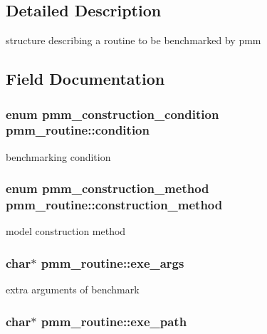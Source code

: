\subsection{Detailed Description}
structure describing a routine to be benchmarked by pmm 

\subsection{Field Documentation}
\hypertarget{structpmm__routine_a99d29ad1702b5fb35a3ea26e2599f0c0}{
\subsubsection[{condition}]{\setlength{\rightskip}{0pt plus 5cm}enum {\bf pmm\-\_\-construction\-\_\-condition} pmm\-\_\-routine\-::condition}}\label{structpmm__routine_a99d29ad1702b5fb35a3ea26e2599f0c0}
benchmarking condition \hypertarget{structpmm__routine_a6aa0c60517889f830e3d533ccf022556}{
\subsubsection[{construction\-\_\-method}]{\setlength{\rightskip}{0pt plus 5cm}enum {\bf pmm\-\_\-construction\-\_\-method} pmm\-\_\-routine\-::construction\-\_\-method}}\label{structpmm__routine_a6aa0c60517889f830e3d533ccf022556}
model construction method \hypertarget{structpmm__routine_a9ba0602ed7998074e27d09f3d84af1d1}{
\subsubsection[{exe\-\_\-args}]{\setlength{\rightskip}{0pt plus 5cm}char$\ast$ pmm\-\_\-routine\-::exe\-\_\-args}}\label{structpmm__routine_a9ba0602ed7998074e27d09f3d84af1d1}
extra arguments of benchmark \hypertarget{structpmm__routine_a252b019e555def99e6b89d00ca94a9a6}{
\subsubsection[{exe\-\_\-path}]{\setlength{\rightskip}{0pt plus 5cm}char$\ast$ pmm\-\_\-routine\-::exe\-\_\-path}}\label{structpmm__routine_a252b019e555def99e6b89d00ca94a9a6}
